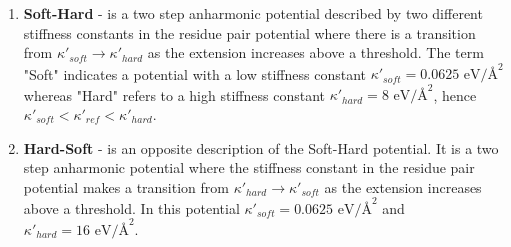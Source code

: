 \begin{enumerate}
\item \textbf{Soft-Hard} - is a two step anharmonic potential described by two different stiffness constants in the residue pair potential where there is a transition from $\kappa'_{soft} \to \kappa'_{hard}$ as the extension increases above a threshold. The term "Soft" indicates a potential with a low stiffness constant $\kappa'_{soft}=0.0625 \text{ eV/\AA}^{2}$ whereas "Hard" refers to a high stiffness constant $\kappa'_{hard}=8 \text{ eV/\AA}^{2}$, hence $\kappa'_{soft} < \kappa'_{ref} < \kappa'_{hard}$. 

\item \textbf{Hard-Soft} - is an opposite description of the Soft-Hard potential. It is a two step anharmonic potential where the stiffness constant in the residue pair potential makes a transition from $\kappa'_{hard} \to \kappa'_{soft}$ as the extension increases above a threshold. In this potential $\kappa'_{soft}=0.0625 \text{ eV/\AA}^{2}$ and $\kappa'_{hard}=16 \text{ eV/\AA}^{2}$.

\end{enumerate}

